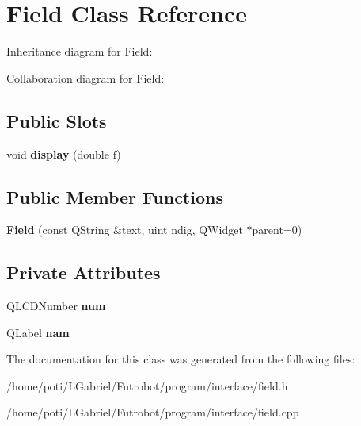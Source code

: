 \hypertarget{classField}{}\section{Field Class Reference}
\label{classField}


Inheritance diagram for Field\+:


Collaboration diagram for Field\+:
\subsection*{Public Slots}
\begin{DoxyCompactItemize}
\item 
void {\bfseries display} (double f)\hypertarget{classField_a3b04abc8adf6bd169cab0b8a40253e2f}{}\label{classField_a3b04abc8adf6bd169cab0b8a40253e2f}

\end{DoxyCompactItemize}
\subsection*{Public Member Functions}
\begin{DoxyCompactItemize}
\item 
{\bfseries Field} (const Q\+String \&text, uint ndig, Q\+Widget $\ast$parent=0)\hypertarget{classField_ac8b7e96f281333177e3a809563e2584f}{}\label{classField_ac8b7e96f281333177e3a809563e2584f}

\end{DoxyCompactItemize}
\subsection*{Private Attributes}
\begin{DoxyCompactItemize}
\item 
Q\+L\+C\+D\+Number {\bfseries num}\hypertarget{classField_a73716c317ed09142dd5ce57e5a25ba70}{}\label{classField_a73716c317ed09142dd5ce57e5a25ba70}

\item 
Q\+Label {\bfseries nam}\hypertarget{classField_a2068f79b5a30565fd91920a6d3a02508}{}\label{classField_a2068f79b5a30565fd91920a6d3a02508}

\end{DoxyCompactItemize}


The documentation for this class was generated from the following files\+:\begin{DoxyCompactItemize}
\item 
/home/poti/\+L\+Gabriel/\+Futrobot/program/interface/field.\+h\item 
/home/poti/\+L\+Gabriel/\+Futrobot/program/interface/field.\+cpp\end{DoxyCompactItemize}
